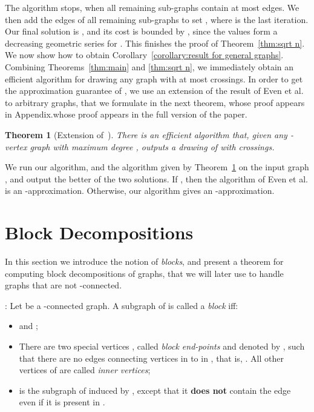 \documentclass[twoside,leqno,twocolumn]{article}
\newtheorem{theorem}{Theorem}
\newenvironment{Definition}{{\bf Definition}: }{}
\begin{document}
The algorithm stops, when all remaining sub-graphs contain at most  edges. We then add the edges of all remaining sub-graphs to set , where  is the last iteration. Our final solution is , and its cost is bounded by , since the values  form a decreasing geometric series for . This finishes the proof of Theorem~\ref{thm:sqrt n}.
We now show how to obtain Corollary~\ref{corollary:result for general graphs}. Combining Theorems~\ref{thm:main} and \ref{thm:sqrt n}, we immediately obtain an efficient algorithm for drawing any graph  with at most  crossings. In order to get the approximation guarantee of , we use an extension of the result of Even et al.~\cite{EvenGS02} to arbitrary graphs, that we formulate in the next theorem, \iffull whose proof appears in Appendix.\fi \ifabstract whose proof appears in the full version of the paper.\fi

\begin{theorem}[Extension of~\cite{EvenGS02}]\label{thm: Even: extension}
There is an efficient algorithm that, given any -vertex graph  with maximum degree , outputs a drawing of  with  crossings.
\end{theorem}

We run our algorithm, and the algorithm given by Theorem~\ref{thm: Even: extension} on the input graph , and output the better of the two solutions. If , then the algorithm of Even et al. is an -approximation. Otherwise, our algorithm gives an -approximation.










\iffull
\newpage
\fi

\appendix
\section{Block Decompositions}\label{sec: blocks}
In this section we introduce the notion of \textit{blocks}, and present a theorem for computing block decompositions of graphs, that we will
later use to handle graphs that are not -connected. 


\begin{Definition}
Let  be a -connected graph. 
A subgraph  of  is called a \emph{block} iff: 

\begin{itemize}
\item  and ;
\item There are two special vertices , called \emph{block end-points} and denoted by , such that there are no edges connecting vertices in  to  in , that is, . All other vertices of  are called \emph{inner vertices}; 

\item   is the subgraph of  induced by , except that it {\bf does not} contain the edge  even if it is present in .
\end{itemize}
\end{Definition}
\end{document}
